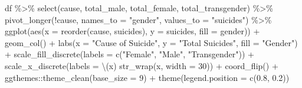 \documentclass[
  letterpaper,
  DIV=11,
  numbers=noendperiod]{scrartcl}
\newenvironment{Shaded}{\begin{snugshade}}{\end{snugshade}}
\newcommand{\AttributeTok}[1]{\textcolor[rgb]{0.40,0.45,0.13}{#1}}
\newcommand{\DecValTok}[1]{\textcolor[rgb]{0.68,0.00,0.00}{#1}}
\newcommand{\FloatTok}[1]{\textcolor[rgb]{0.68,0.00,0.00}{#1}}
\newcommand{\FunctionTok}[1]{\textcolor[rgb]{0.28,0.35,0.67}{#1}}
\newcommand{\NormalTok}[1]{\textcolor[rgb]{0.00,0.23,0.31}{#1}}
\newcommand{\SpecialCharTok}[1]{\textcolor[rgb]{0.37,0.37,0.37}{#1}}
\newcommand{\StringTok}[1]{\textcolor[rgb]{0.13,0.47,0.30}{#1}}
\begin{document}
\begin{Shaded}
\begin{Highlighting}[]
\NormalTok{df }\SpecialCharTok{\%\textgreater{}\%} 
   \FunctionTok{select}\NormalTok{(cause, total\_male, total\_female, total\_transgender) }\SpecialCharTok{\%\textgreater{}\%} 
   \FunctionTok{pivot\_longer}\NormalTok{(}\SpecialCharTok{!}\NormalTok{cause, }\AttributeTok{names\_to =} \StringTok{"gender"}\NormalTok{, }\AttributeTok{values\_to =} \StringTok{"suicides"}\NormalTok{) }\SpecialCharTok{\%\textgreater{}\%} 
   \FunctionTok{ggplot}\NormalTok{(}\FunctionTok{aes}\NormalTok{(}\AttributeTok{x =} \FunctionTok{reorder}\NormalTok{(cause, suicides), }\AttributeTok{y =}\NormalTok{ suicides, }\AttributeTok{fill =}\NormalTok{ gender)) }\SpecialCharTok{+}
   \FunctionTok{geom\_col}\NormalTok{() }\SpecialCharTok{+}
   \FunctionTok{labs}\NormalTok{(}\AttributeTok{x =} \StringTok{"Cause of Suicide"}\NormalTok{, }\AttributeTok{y =} \StringTok{"Total Suicides"}\NormalTok{, }\AttributeTok{fill =} \StringTok{"Gender"}\NormalTok{) }\SpecialCharTok{+}
   \FunctionTok{scale\_fill\_discrete}\NormalTok{(}\AttributeTok{labels =} \FunctionTok{c}\NormalTok{(}\StringTok{"Female"}\NormalTok{, }\StringTok{"Male"}\NormalTok{, }\StringTok{"Transgender"}\NormalTok{)) }\SpecialCharTok{+}
   \FunctionTok{scale\_x\_discrete}\NormalTok{(}\AttributeTok{labels =}\NormalTok{ \textbackslash{}(x) }\FunctionTok{str\_wrap}\NormalTok{(x, }\AttributeTok{width =} \DecValTok{30}\NormalTok{)) }\SpecialCharTok{+}
   \FunctionTok{coord\_flip}\NormalTok{() }\SpecialCharTok{+}
\NormalTok{   ggthemes}\SpecialCharTok{::}\FunctionTok{theme\_clean}\NormalTok{(}\AttributeTok{base\_size =} \DecValTok{9}\NormalTok{) }\SpecialCharTok{+}
   \FunctionTok{theme}\NormalTok{(}\AttributeTok{legend.position =} \FunctionTok{c}\NormalTok{(}\FloatTok{0.8}\NormalTok{, }\FloatTok{0.2}\NormalTok{))}
\end{Highlighting}
\end{Shaded}
\end{document}
